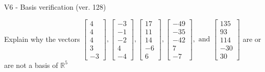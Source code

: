 \begin{exercise}
  \begin{exerciseTitle}V6 - Basis verification (ver. 128)\end{exerciseTitle}
  \begin{exerciseStatement}
    Explain why the vectors \(\left[\begin{array}{r}
4 \\
4 \\
4 \\
3 \\
-3
\end{array}\right] , \left[\begin{array}{r}
-3 \\
-1 \\
-2 \\
4 \\
-4
\end{array}\right] , \left[\begin{array}{r}
17 \\
11 \\
14 \\
-6 \\
6
\end{array}\right] , \left[\begin{array}{r}
-49 \\
-35 \\
-42 \\
7 \\
-7
\end{array}\right] , \text{ and } \left[\begin{array}{r}
135 \\
93 \\
114 \\
-30 \\
30
\end{array}\right]\) are or are not a basis of \(\mathbb{R}^5\)	



\end{exerciseStatement}
\end{exercise}
